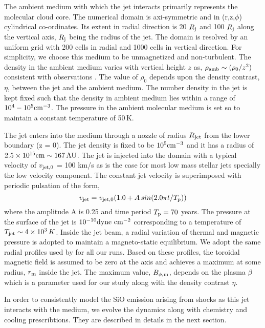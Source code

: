 \documentclass[useAMS,usenatbib,letters]{mn2e}
\begin{document}
The ambient medium with which the jet interacts primarily
represents the molecular cloud core. The numerical domain is axi-symmetric
and in (r,z,$\phi$) cylindrical co-ordinates. Its extent in radial
direction is 20 $R_{\rm j}$ and 100
$R_{\rm j}$ along the vertical axis, $R_{\rm j}$ being the radius of
the jet. The domain is resolved by an uniform grid with 200 cells in
radial and 1000 cells in vertical direction. For simplicity, we choose this medium
to be unmagnetized and non-turbulent. The density in the ambient
medium varies with vertical height $z$ as, $\rho_{\rm amb}\sim (\rho_0/z^{2})$
consistent with observations \citep{Caselli:2011p13935}. The value of
$\rho_0$ depends upon the density contrast, $\eta$, between the jet and
the ambient medium. The number density in the jet is kept fixed such
that the density in ambient medium lies within a range of $10^{4}-10^{5}
\rm cm^{-3}$. The pressure in the ambient molecular medium is
set so to maintain a constant temperature of 50\,K. 
%

The jet enters into the medium through a nozzle of radius $R_{\rm jet}$
from the lower boundary (z = 0). The jet density is fixed to
be $10^{5} \rm cm^{-3}$ and it has a radius of $2.5\times10^{15} \rm cm \sim
167\,AU$. The jet is injected into the domain with a typical 
velocity of $v_{\rm jet,0}$ = 100 km/s as is the case for most low mass stellar jets
specially the low velocity component. The constant jet velocity is
superimposed with periodic pulsation of the form,
\begin{equation}
v_{\rm jet} = v_{\rm jet,0}(1.0 + A\,sin(2.0\pi t/T_{\rm p}))
\end{equation}
where the amplitude A is 0.25 and time period $T_{\rm p} = 70$
years. The pressure at the surface of the jet is $10^{-10} \rm
dyne\,\,cm^{-2}$ corresponding to a temperature of $T_{\rm jet} \sim
4\times10^{3}\,K$. Inside the jet beam, a radial variation of thermal
and magnetic pressure is adopted to maintain a magneto-static
equilibrium. We adopt the
same radial profiles used by \cite{Stone:2000p2650} for all our runs. 
Based on these profiles, the toroidal magnetic field is assumed to be
zero at the axis and achieves a maximum at some radius, $r_{\rm m}$
inside the jet. The maximum value, $B_{\phi,\rm m}$, depends on the
plasma $\beta$ which is a parameter used for our study along with the
density contrast $\eta$.
%

In order to consistently model the SiO emission arising from shocks as
this jet interacts with the medium, we evolve the dynamics along with
chemistry and cooling prescribtions. They are described in details in
the next section.
\end{document}
